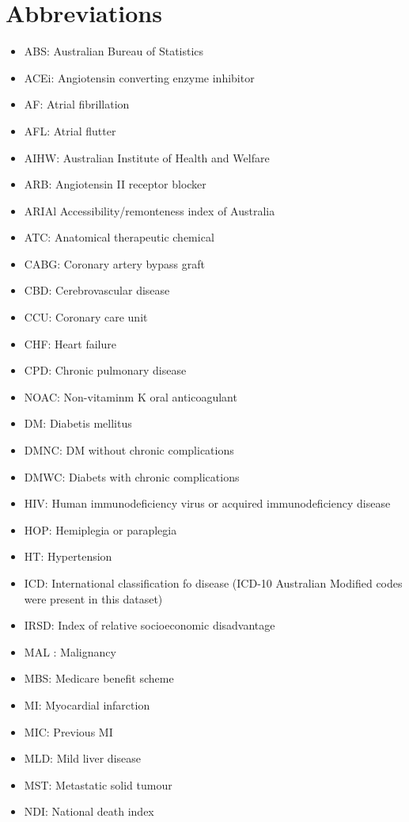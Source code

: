 \documentclass[11pt]{article}
\begin{document}
\section{Abbreviations}

\begin{itemize}
\item ABS: Australian Bureau of Statistics
\item ACEi: Angiotensin converting enzyme inhibitor
\item AF: Atrial fibrillation
\item AFL: Atrial flutter
\item AIHW: Australian Institute of Health and Welfare
\item ARB: Angiotensin II receptor blocker
\item ARIAl Accessibility/remonteness index of Australia
\item ATC: Anatomical therapeutic chemical
\item CABG: Coronary artery bypass graft
\item CBD: Cerebrovascular disease 
\item CCU: Coronary care unit
\item CHF: Heart failure
\item CPD: Chronic pulmonary disease
\item NOAC: Non-vitaminm K oral anticoagulant
\item DM: Diabetis mellitus
\item DMNC: DM without chronic complications
\item DMWC: Diabets with chronic complications
\item HIV: Human immunodeficiency virus or acquired immunodeficiency disease
\item HOP: Hemiplegia or paraplegia
\item HT: Hypertension
\item ICD: International classification fo disease (ICD-10 Australian Modified codes were present in this dataset)
\item IRSD: Index of relative socioeconomic disadvantage
\item MAL : Malignancy
\item MBS: Medicare benefit scheme
\item MI: Myocardial infarction
\item MIC: Previous MI
\item MLD: Mild liver disease
\item MST: Metastatic solid tumour
\item NDI: National death index

\end{itemize}
\end{document}
